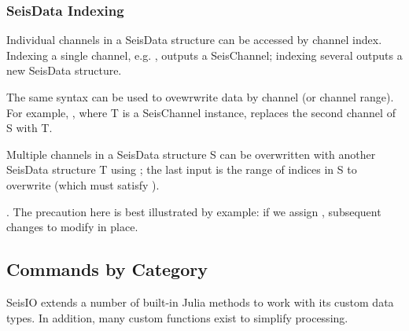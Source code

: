\documentclass[letterpaper,11pt,english]{sphinxmanual}
\begin{document}
\begin{sphinxVerbatim}[commandchars=\\\{\}]
   
   
    
\end{sphinxVerbatim}


\subsubsection{SeisData Indexing}
\label{\detokenize{src/seisdata:seisdata-indexing}}
Individual channels in a SeisData structure can be accessed by channel index. Indexing a single channel, e.g. , outputs a SeisChannel; indexing several outputs a new SeisData structure.

The same syntax can be used to ovewrwrite data by channel (or channel range). For example, , where T is a SeisChannel instance, replaces the second channel of S with T.

Multiple channels in a SeisData structure S can be overwritten with another SeisData structure T using ; the last input is the range of indices in S to overwrite (which must satisfy ).

. The precaution here is best illustrated by example: if we assign , subsequent changes to  modify  in place.


\subsection{Commands by Category}
\label{\detokenize{src/seisdata:commands-by-category}}
SeisIO extends a number of built-in Julia methods to work with its custom data types. In addition, many custom functions exist to simplify processing.
\end{document}
